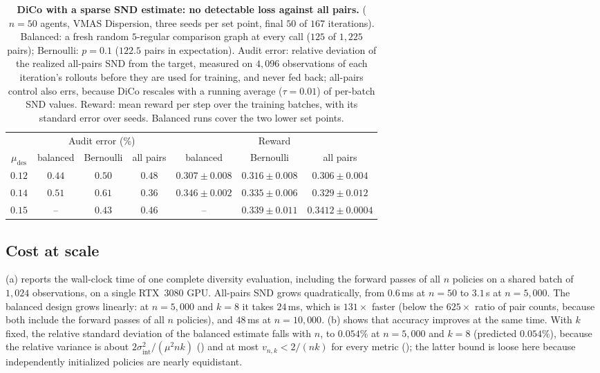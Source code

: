 \documentclass[twoside,11pt]{article}
\newcommand{\sigmaint}{\sigma^2_{\mathrm{int}}}
\newcommand{\SNDdes}{\mu_{\mathrm{des}}}
\begin{document}
\begin{table}[t]
\centering
\small
\caption{\textbf{DiCo with a sparse SND estimate: no detectable loss against all pairs.}
($n=50$ agents, VMAS Dispersion, three seeds per set point, final $50$ of $167$
iterations). Balanced: a fresh random $5$-regular comparison graph at every
call ($125$ of $1{,}225$ pairs); Bernoulli: $p=0.1$ ($122.5$ pairs in
expectation). Audit error: relative deviation of the realized all-pairs SND
from the target, measured on $4{,}096$ observations of each iteration's
rollouts before they are used for training, and never fed back; all-pairs control also errs, because DiCo rescales with a running
average ($\tau=0.01$) of per-batch SND values. Reward: mean reward per step over the training batches,
with its standard error over seeds. Balanced runs cover the two lower set
points.}
\label{tab:dico}
\begin{tabular}{@{}ccccccc@{}}
\toprule
& \multicolumn{3}{c}{Audit error (\%)} & \multicolumn{3}{c}{Reward} \\
\cmidrule(lr){2-4}\cmidrule(l){5-7}
$\SNDdes$ & balanced & Bernoulli & all pairs & balanced & Bernoulli & all pairs \\
\midrule
$0.12$ & $0.44$ & $0.50$ & $0.48$ & $0.307\pm0.008$ & $0.316\pm0.008$ & $0.306\pm0.004$ \\
$0.14$ & $0.51$ & $0.61$ & $0.36$ & $0.346\pm0.002$ & $0.335\pm0.006$ & $0.329\pm0.012$ \\
$0.15$ & -- & $0.43$ & $0.46$ & -- & $0.339\pm0.011$ & $0.3412\pm0.0004$ \\
\bottomrule
\end{tabular}
\end{table}



\subsection{Cost at scale}
\label{sec:exp-scale}

(a) reports the wall-clock time of one complete diversity
evaluation, including the forward passes of all $n$ policies on a shared
batch of $1{,}024$ observations, on a single RTX~3080 GPU. All-pairs SND
grows quadratically, from $0.6$\,ms at $n=50$ to $3.1$\,s at $n=5{,}000$.
The balanced design grows linearly: at $n=5{,}000$ and $k=8$ it takes
$24$\,ms, which is $131\times$ faster (below the $625\times$ ratio of pair
counts, because both include the forward passes of all $n$ policies), and
$48$\,ms at $n=10{,}000$. (b) shows that accuracy improves
at the same time. With $k$ fixed, the relative standard deviation of the
balanced estimate falls with $n$, to $0.054\%$ at $n=5{,}000$ and $k=8$
(predicted $0.054\%$), because the relative variance is about
$2\sigmaint/(\mu^2nk)$ () and at most $v_{n,k}<2/(nk)$
for every metric (); the latter bound is loose here because
independently initialized policies are nearly equidistant.
\end{document}
